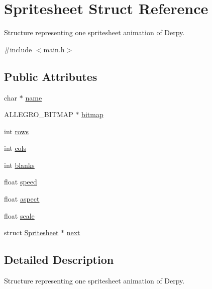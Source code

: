 \hypertarget{structSpritesheet}{\section{Spritesheet Struct Reference}
\label{structSpritesheet}
}


Structure representing one spritesheet animation of Derpy.  




{\ttfamily \#include $<$main.\-h$>$}

\subsection*{Public Attributes}
\begin{DoxyCompactItemize}
\item 
char $\ast$ \hyperlink{structSpritesheet_a6788d53f825bd74cda7e50e75435befa}{name}
\item 
A\-L\-L\-E\-G\-R\-O\-\_\-\-B\-I\-T\-M\-A\-P $\ast$ \hyperlink{structSpritesheet_ad31be6e59349586862e6a813ea139bcb}{bitmap}
\item 
int \hyperlink{structSpritesheet_aeab321ce6cdd45cc8a5078e80480510e}{rows}
\item 
int \hyperlink{structSpritesheet_a3d512755ce492a35e1816fe026cc37c9}{cols}
\item 
int \hyperlink{structSpritesheet_a5010b18959949b1c577078f94a810ef3}{blanks}
\item 
float \hyperlink{structSpritesheet_ad011770ca540de2bad85f0cb155c774b}{speed}
\item 
float \hyperlink{structSpritesheet_a85c93c8d80227725374e1581c4c8e049}{aspect}
\item 
float \hyperlink{structSpritesheet_ac46cf3d01609f66aae140e3b7d3d1109}{scale}
\item 
struct \hyperlink{structSpritesheet}{Spritesheet} $\ast$ \hyperlink{structSpritesheet_a671f77f759138aa2c852e5252b6daac5}{next}
\end{DoxyCompactItemize}


\subsection{Detailed Description}
Structure representing one spritesheet animation of Derpy. 

